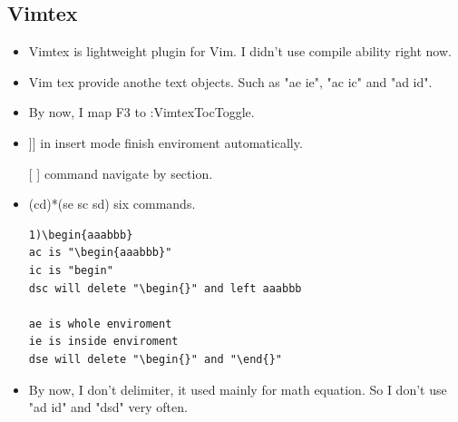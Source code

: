 \documentclass[a4paper,12pt,twoside]{book}
\begin{document}
\subsection{Vimtex}
\begin{itemize}
		\item Vimtex is lightweight plugin for Vim. I didn't use compile ability right now. 
		\item Vim tex provide anothe text objects. Such as "ae ie", "ac ic" and "ad id". 
		\item By now, I map F3 to :VimtexTocToggle.
		\item ]] in insert mode finish enviroment automatically.
		\item [[ ]] command navigate by section.
		\item (cd)*(se sc sd) six commands. 
\begin{verbatim}
1)\begin{aaabbb}
ac is "\begin{aaabbb}"
ic is "begin"
dsc will delete "\begin{}" and left aaabbb

ae is whole enviroment
ie is inside enviroment
dse will delete "\begin{}" and "\end{}" 
\end{verbatim}
	\item By now, I don't delimiter, it used mainly for math equation. So I don't use "ad id" and "dsd" very often. 
			\end{itemize}
\end{document}

